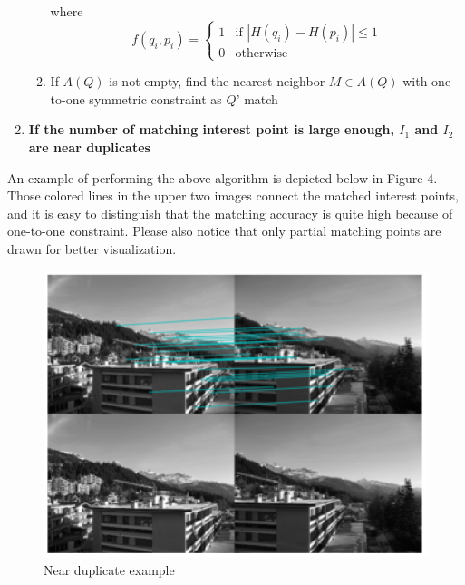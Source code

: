 \begin{enumerate}
\begin{enumerate}
    where 
    \begin{equation*}
        f(q_i, p_i) = \begin{cases}
                   1     & \text{if } \left|H(q_i) - H(p_i)\right| \leq 1\\
                   0 & \text{otherwise}
               \end{cases}
    \end{equation*}

    \item {If $A(Q)$ is not empty, find the nearest neighbor $M \in A(Q)$ with one-to-one symmetric constraint as $Q$' match}
    \end{enumerate}

  \item{\bfseries If the number of matching interest point is large enough, $I_1$ and $I_2$ are near duplicates}
\end{enumerate}

\noindent An example of performing the above algorithm is depicted below in Figure 4. Those colored lines in the upper two images connect the matched interest points, and it is easy to distinguish that the matching accuracy is quite high because of one-to-one constraint. Please also notice that only partial matching points are drawn for better visualization. 
  \begin{figure}[!ht]
  \centering
    \includegraphics[scale = 0.8]{./match.png}
  \caption{Near duplicate example}
  \end{figure}

